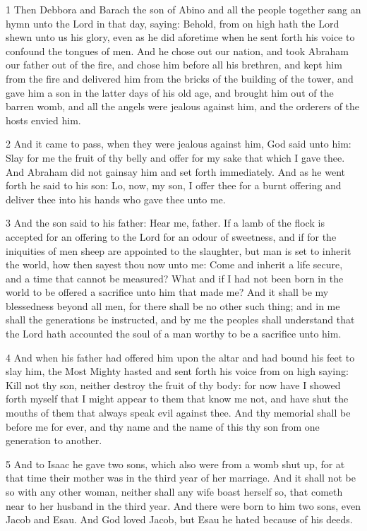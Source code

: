\par 1 Then Debbora and Barach the son of Abino and all the people together sang an hymn unto the Lord in that day, saying: Behold, from on high hath the Lord shewn unto us his glory, even as he did aforetime when he sent forth his voice to confound the tongues of men. And he chose out our nation, and took Abraham our father out of the fire, and chose him before all his brethren, and kept him from the fire and delivered him from the bricks of the building of the tower, and gave him a son in the latter days of his old age, and brought him out of the barren womb, and all the angels were jealous against him, and the orderers of the hosts envied him. 

\par 2 And it came to pass, when they were jealous against him, God said unto him: Slay for me the fruit of thy belly and offer for my sake that which I gave thee. And Abraham did not gainsay him and set forth immediately. And as he went forth he said to his son: Lo, now, my son, I offer thee for a burnt offering and deliver thee into his hands who gave thee unto me. 

\par 3 And the son said to his father: Hear me, father. If a lamb of the flock is accepted for an offering to the Lord for an odour of sweetness, and if for the iniquities of men sheep are appointed to the slaughter, but man is set to inherit the world, how then sayest thou now unto me: Come and inherit a life secure, and a time that cannot be measured? What and if I had not been born in the world to be offered a sacrifice unto him that made me? And it shall be my blessedness beyond all men, for there shall be no other such thing; and in me shall the generations be instructed, and by me the peoples shall understand that the Lord hath accounted the soul of a man worthy to be a sacrifice unto him. 

\par 4 And when his father had offered him upon the altar and had bound his feet to slay him, the Most Mighty hasted and sent forth his voice from on high saying: Kill not thy son, neither destroy the fruit of thy body: for now have I showed forth myself that I might appear to them that know me not, and have shut the mouths of them that always speak evil against thee. And thy memorial shall be before me for ever, and thy name and the name of this thy son from one generation to another.

\par 5 And to Isaac he gave two sons, which also were from a womb shut up, for at that time their mother was in the third year of her marriage. And it shall not be so with any other woman, neither shall any wife boast herself so, that cometh near to her husband in the third year. And there were born to him two sons, even Jacob and Esau. And God loved Jacob, but Esau he hated because of his deeds.


